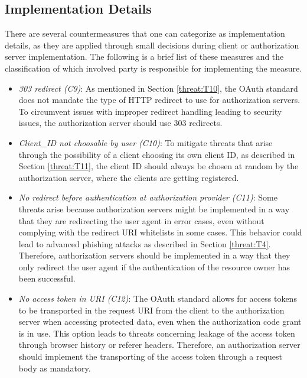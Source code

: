 \subsection{Implementation Details}
\label{counter:C9_10_11_12_13_14}

There are several countermeasures that one can categorize as implementation details, as they are applied through small decisions during client or authorization server implementation. The following is a brief list of these measures and the classification of which involved party is responsible for implementing the measure.
\begin{itemize}

\item \emph{303 redirect (C9)}: As mentioned in Section \ref{threat:T10}, the OAuth standard does not mandate the type of HTTP redirect to use for authorization servers. To circumvent issues with improper redirect handling leading to security issues, the authorization server should use 303 redirects.

\item \emph{Client\_ID not choosable by user (C10)}: To mitigate threats that arise through the possibility of a client choosing its own client ID, as described in Section \ref{threat:T11}, the client ID should always be chosen at random by the authorization server, where the clients are getting registered.

\item \emph{No redirect before authentication at authorization provider (C11)}: Some threats arise because authorization servers might be implemented in a way that they are redirecting the user agent in error cases, even without complying with the redirect URI whitelists in some cases. This behavior could lead to advanced phishing attacks as described in Section \ref{threat:T4}. Therefore, authorization servers should be implemented in a way that they only redirect the user agent if the authentication of the resource owner has been successful.

\item \emph{No access token in URI (C12)}: The OAuth standard allows for access tokens to be transported in the request URI from the client to the authorization server when accessing protected data, even when the authorization code grant is in use. This option leads to threats concerning leakage of the access token through browser history or referer headers. Therefore, an authorization server should implement the transporting of the access token through a request body as mandatory.


\end{itemize}
